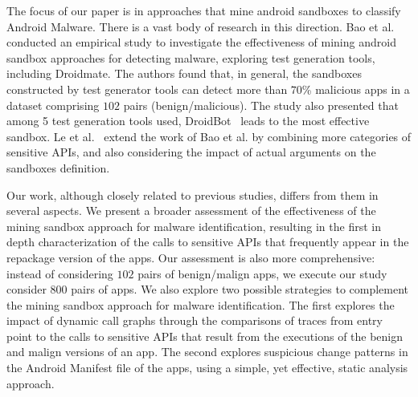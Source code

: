The focus of our paper is in approaches that mine android sandboxes to classify Android Malware.
There is a vast body of research in this direction. 
Bao et al.~\cite{DBLP:conf/wcre/BaoLL18} conducted an empirical study to investigate the effectiveness of mining android sandbox
approaches
for detecting malware, exploring test generation tools, including Droidmate. The authors found that, in general, the sandboxes constructed by test generator tools can detect more than $70$\% malicious apps in a dataset comprising $102$ pairs (benign/malicious). The study also presented that among 5 test generation tools used, DroidBot~\cite{DBLP:conf/icse/LiYGC17} leads to the most effective sandbox.
Le et al.~\cite{le2018towards} extend the work of Bao et al. by combining more categories of sensitive APIs, and also considering the impact of
actual arguments on the sandboxes definition.

Our work, although closely related to previous studies, differs from them in several aspects. We present a broader assessment of the effectiveness of the mining sandbox approach for malware identification, resulting in the first in depth characterization of the calls to sensitive APIs that frequently appear in the repackage version of the apps. Our assessment is also more comprehensive: instead of considering $102$ pairs of benign/malign apps, we execute our study consider {\color{red}800} pairs of apps. We also explore two possible strategies to complement the mining sandbox approach for malware identification. The first explores the impact of dynamic call graphs through the comparisons of traces from entry point to the calls to sensitive APIs that result from the executions of the benign and malign versions of an app. The second explores suspicious change patterns in the Android Manifest file of the apps, using a simple, yet effective, static analysis approach.

